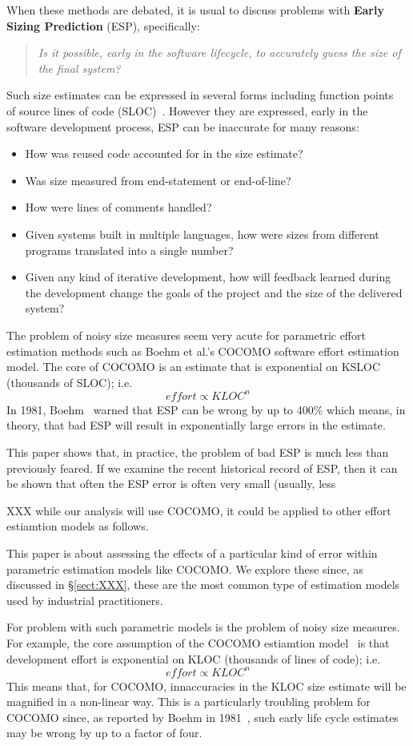 \documentclass[final,twocolumn,5p]{elsarticle}
\newcommand{\bi}{\begin{itemize}[leftmargin=0.4cm]}
\newcommand{\ei}{\end{itemize}}
\newcommand{\tion}[1]{\S\ref{sect:#1}}
\begin{document}
When these methods are debated, it is usual to discuss problems with {\bf Early Sizing Prediction} (ESP),
specifically:
\begin{quote}
 {\em Is it possible, early in the software lifecycle,
    to accurately guess the size of the final system?}
  \end{quote}
Such size estimates can be expressed in several
forms including function points~\cite{Albrecht83} of  source lines of code (SLOC)~\cite{boehm81}.
However they are expressed, early in the software development process,
ESP can be inaccurate for many reasons:
\bi
\item How was reused code accounted for in the size estimate?
\item  Was size measured from end-statement or end-of-line?
\item How were lines of comments handled?
\item Given systems built in multiple languages, how were sizes from different programs translated
  into a single number?
\item
  Given any kind of iterative development, how will feedback learned during the development change
  the goals of the project and the size of the delivered system?
  \ei
The  problem of noisy size measures seem very acute for parametric effort estimation
methods such as Boehm et al.'s COCOMO software effort estimation model.
The core of COCOMO  is an estimate that is exponential on KSLOC (thousands of SLOC); i.e.
\[
\mathit{effort} \propto \mathit{KLOC}^n
\]
In 1981, Boehm~\cite{hoem1981} warned that ESP can be wrong by up to 400\%
which means, in theory,  that bad ESP will result in exponentially large errors in the estimate.

This paper shows that, in practice, the problem of bad ESP is much less than previously feared.
If we examine the recent historical record of ESP, then it can be shown that often the ESP
error is often very small (usually, less 

XXX while our analysis will use COCOMO, it could be applied to other effort estiamtion models
as follows.

This paper is about assessing the effects of a particular kind of
error within parametric estimation models like COCOMO.
We explore these since, as discussed in \tion{XXX}, these are the most
common type of estimation models used by industrial practitioners.


For problem with such parametric models is the  problem of noisy size measures.
For example, 
the core assumption of the COCOMO  estiamtion model~\cite{boehm81,boehm00b}
is that development effort
is exponential on KLOC (thousands of lines of code); i.e.
\[
\mathit{effort} \propto \mathit{KLOC}^n
\]
This means that, for COCOMO,  innaccuracies in the 
KLOC size estimate will be magnified in a non-linear way. This is a particularly
troubling problem for COCOMO since, as reported by Boehm in 1981~\cite{boehm81},
such early life cycle estimates may be wrong by up to a factor of four.
\end{document}
